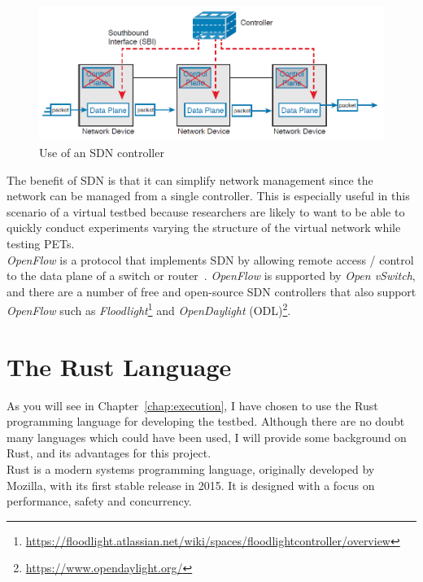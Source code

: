 \documentclass[
    author={Jacob Daniel Halsey},
    supervisor={Prof. Awais Rashid},
    degree={BSc},
    title={Building a Testbed for Evaluating Privacy Enhancing Technologies  (PETs)},
    subtitle={},
    type={software development},
    year={2021}
]{dissertation}
\begin{document}
\begin{figure}
	\centering
	\includegraphics[width=12cm]{img/sdn}
	\caption{Use of an SDN controller~\cite[767]{odom_2016_ccna}}
	\label{fig:sdn_diagram}
\end{figure}

The benefit of SDN is that it can simplify network management since the network can be 
managed from a single controller. This is especially useful in this scenario of 
a virtual testbed because researchers are likely to want to be able to quickly conduct experiments 
varying the structure of the virtual network while testing PETs.\\

\emph{OpenFlow} is a protocol that implements SDN by allowing remote access / control to the data plane
of a switch or router~\cite{openflow}. \emph{OpenFlow} is supported by \emph{Open vSwitch}, and there
are a number of free and open-source SDN controllers that also support \emph{OpenFlow} such as
\emph{Floodlight}\footnote{\url{https://floodlight.atlassian.net/wiki/spaces/floodlightcontroller/overview}}
and \emph{OpenDaylight} (ODL)\footnote{\url{https://www.opendaylight.org/}}.

\section{The Rust Language}

As you will see in Chapter~\ref{chap:execution}, I have chosen to use the Rust programming
language for developing the testbed. Although there are no doubt many languages which
could have been used, I will provide some background on Rust, and its advantages for this
project. \\

Rust is a modern systems programming language, originally developed by Mozilla, 
with its first stable release in 2015. It is designed with a focus on performance, safety
and concurrency. \\
\end{document}
